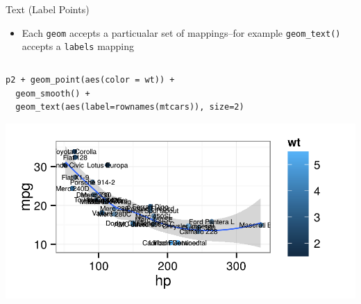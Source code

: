 \documentclass[table,smaller]{beamer}
\begin{document}
\begin{frame}[fragile,label=sec-2-6]{Text (Label Points)}
 \begin{itemize}
\item Each \texttt{geom} accepts a particualar set of mappings--for example \texttt{geom\_text()} accepts a \texttt{labels} mapping
\end{itemize}

\begin{columns}  \begin{block}{}

\begin{verbatim}
p2 + geom_point(aes(color = wt)) +
  geom_smooth() +
  geom_text(aes(label=rownames(mtcars)), size=2)
\end{verbatim}

\includegraphics[width=.9\linewidth]{images/textGeomMapping.png}

\end{block} \end{columns}
\end{frame}
\end{document}
